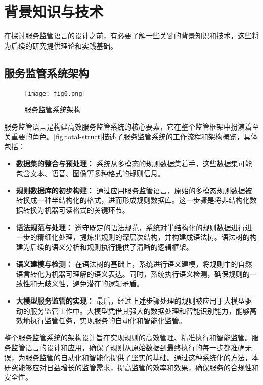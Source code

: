 \newpage

\section{背景知识与技术}

在探讨服务监管语言的设计之前，有必要了解一些关键的背景知识和技术，这些将为后续的研究提供理论和实践基础。

\subsection{服务监管系统架构}

\begin{figure}[ht]
    \centering
    \texttt{[image: fig0.png]}
    \caption{\label{fig:total-struct}服务监管系统架构}
\end{figure}

服务监管语言是构建高效服务监管系统的核心要素，它在整个监管框架中扮演着至关重要的角色。\autoref{fig:total-struct}描述了服务监管系统的工作流程和架构概览，具体包括：

\begin{itemize}
    \item \textbf{数据集的整合与预处理：} 系统从多模态的规则数据集着手，这些数据集可能包含文本、语音、图像等多种格式的规则信息。
    \item \textbf{规则数据库的初步构建：} 通过应用服务监管语言，原始的多模态规则数据被转换成一种半结构化的格式，进而形成规则数据库。这一步骤是将非结构化数据转换为机器可读格式的关键环节。
    \item \textbf{语法规范与处理：} 遵守既定的语法规范，系统对半结构化的规则数据进行进一步的精细化处理，提炼出规则的深层次结构，并构建成语法树。语法树的构建为后续的语义分析和规则执行提供了清晰的逻辑框架。
    \item \textbf{语义建模与检测：} 在语法树的基础上，系统进行语义建模，将规则中的自然语言转化为机器可理解的语义表达。同时，系统执行语义检测，确保规则的一致性和无歧义性，避免潜在的逻辑矛盾。
    \item \textbf{大模型服务监管的实现：} 最后，经过上述步骤处理的规则被应用于大模型驱动的服务监管工作中。大模型凭借其强大的数据处理和智能识别能力，能够高效地执行监管任务，实现服务的自动化和智能化监管。
\end{itemize}

整个服务监管系统的架构设计旨在实现规则的高效管理、精准执行和智能监管。服务监管语言的设计和应用，确保了规则从原始数据到最终执行的每一步都准确无误，为服务监管的自动化和智能化提供了坚实的基础。通过这种系统化的方法，本研究能够应对日益增长的监管需求，提高监管的效率和效果，确保服务的合规性和安全性。

